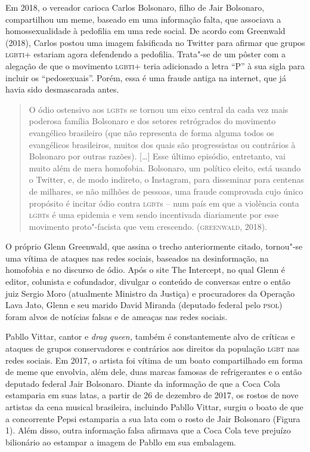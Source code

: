Em 2018, o vereador carioca Carlos Bolsonaro, filho de Jair Bolsonaro,
compartilhou um meme, baseado em uma informação falta, que associava a
homossexualidade à pedofilia em uma rede social. De acordo com Greenwald
(2018), Carlos postou uma imagem falsificada no Twitter para afirmar que
grupos \textsc{lgbti}+ estariam agora defendendo a pedofilia. Trata"-se de um
pôster com a alegação de que o movimento \textsc{lgbti}+ teria adicionado a letra
``P'' à sua sigla para incluir os ``pedosexuais''. Porém, essa é uma
fraude antiga na internet, que já havia sido desmascarada antes.

\begin{quote}
O ódio ostensivo aos \textsc{lgbt}s se tornou um eixo central da cada vez mais
poderosa família Bolsonaro e dos setores retrógrados do movimento
evangélico brasileiro (que não representa de forma alguma todos os
evangélicos brasileiros, muitos dos quais são progressistas ou
contrários à Bolsonaro por outras razões). {[}\ldots{}{]} Esse último
episódio, entretanto, vai muito além de mera homofobia. Bolsonaro, um
político eleito, está usando o Twitter, e, de modo indireto, o
Instagram, para disseminar para centenas de milhares, se não milhões de
pessoas, uma fraude comprovada cujo único propósito é incitar ódio
contra \textsc{lgbt}s -- num país em que a violência conta \textsc{lgbt}s é uma epidemia e
vem sendo incentivada diariamente por esse movimento proto"-facista que
vem crescendo. (\textsc{greenwald}, 2018).
\end{quote}

O próprio Glenn Greenwald, que assina o trecho anteriormente citado,
tornou"-se uma vítima de ataques nas redes sociais, baseados na
desinformação, na homofobia e no discurso de ódio. Após o site The
Intercept, no qual Glenn é editor, colunista e cofundador, divulgar o
conteúdo de conversas entre o então juiz Sergio Moro (atualmente
Ministro da Justiça) e procuradores da Operação Lava Jato, Glenn e seu
marido David Miranda (deputado federal pelo \textsc{psol}) foram alvos de
notícias falsas e de ameaças nas redes sociais.

Pabllo Vittar, cantor e \emph{drag queen,} também é constantemente alvo
de críticas e ataques de grupos conservadores e contrários aos direitos
da população \textsc{lgbt} nas redes sociais. Em 2017, o artista foi vítima de um
boato compartilhado em forma de meme que envolvia, além dele, duas
marcas famosas de refrigerantes e o então deputado federal Jair
Bolsonaro. Diante da informação de que a Coca Cola estamparia em suas
latas, a partir de 26 de dezembro de 2017, os rostos de nove artistas da
cena musical brasileira, incluindo Pabllo Vittar, surgiu o boato de que
a concorrente Pepsi estamparia a sua lata com o rosto de Jair Bolsonaro
(Figura 1). Além disso, outra informação falsa afirmava que a Coca Cola
teve prejuízo bilionário ao estampar a imagem de Pabllo em sua
embalagem.

